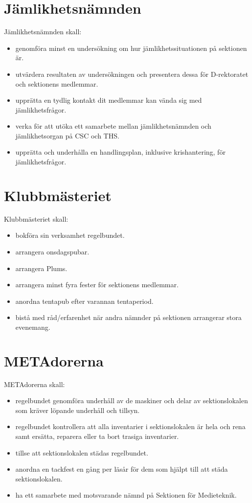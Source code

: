\documentclass[a4paper]{article}
\begin{document}
\section{Jämlikhetsnämnden}
Jämlikhetsnämnden skall:
\begin{itemize}
\item genomföra minst en undersökning om hur jämlikhetssituationen på sektionen är.
\item utvärdera resultaten av undersökningen och presentera dessa för D-rektoratet och sektionens medlemmar.
\item upprätta en tydlig kontakt dit medlemmar kan vända sig med jämlikhetsfrågor.
\item verka för att utöka ett samarbete mellan jämlikhetsnämnden och jämlikhetsorgan på CSC och THS.
\item upprätta och underhålla en handlingsplan, inklusive krishantering, för jämlikhetsfrågor.
\end{itemize}

\section{Klubbmästeriet}
Klubbmästeriet skall:
\begin{itemize}
\item bokföra sin verksamhet regelbundet.
\item arrangera onsdagspubar.
\item arrangera Plums.
\item arrangera minst fyra fester för sektionens medlemmar.
\item anordna tentapub efter varannan tentaperiod.
\item bistå med råd/erfarenhet när andra nämnder på sektionen arrangerar stora evenemang.
\end{itemize}

\section{METAdorerna}
METAdorerna skall:
\begin{itemize}
\item regelbundet genomföra underhåll av de maskiner och delar av sektionslokalen som kräver löpande underhåll och tillsyn.
\item regelbundet kontrollera att alla inventarier i sektionslokalen är hela och rena samt ersätta, reparera eller ta bort trasiga inventarier.
\item tillse att sektionslokalen städas regelbundet.
\item anordna en tackfest en gång per läsår för dem som hjälpt till att städa sektionslokalen.
\item ha ett samarbete med motsvarande nämnd på Sektionen för Medieteknik.
\end{itemize}
\end{document}

